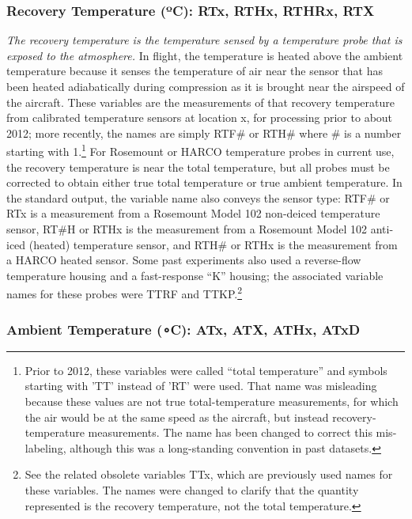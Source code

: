 \documentclass[
  english,
]{book}
\begin{document}
\hypertarget{recovery-t}{%
\subsubsection*{\texorpdfstring{Recovery Temperature ({º}C): RTx, RTHx,
RTHRx,
RTX}{Recovery Temperature (ºC): RTx, RTHx, RTHRx, RTX}}\label{recovery-t}}

\emph{The recovery temperature is the temperature sensed by a
temperature probe that is exposed to the atmosphere.} In flight, the
temperature is heated above the ambient temperature because it senses
the temperature of air near the sensor that has been heated
adiabatically during compression as it is brought near the airspeed of
the aircraft. These variables are the measurements of that recovery
temperature from calibrated temperature sensors at location x, for
processing prior to about 2012; more recently, the names are simply
RTF\# or RTH\# where \# is a number starting with 1.\footnote{Prior to
  2012, these variables were called ``total temperature'' and symbols
  starting with 'TT' instead of 'RT' were used. That name was misleading
  because these values are not true total-temperature measurements, for
  which the air would be at the same speed as the aircraft, but instead
  recovery-temperature measurements. The name has been changed to
  correct this mis-labeling, although this was a long-standing
  convention in past datasets.} For Rosemount or HARCO temperature
probes in current use, the recovery temperature is near the total
temperature, but all probes must be corrected to obtain either true
total temperature or true ambient temperature. In the standard output,
the variable name also conveys the sensor type: RTF\# or RTx is a
measurement from a Rosemount Model 102 non-deiced temperature sensor,
RT\#H or RTHx is the measurement from a Rosemount Model 102 anti-iced
(heated) temperature sensor, and RTH\# or RTHx is the measurement from a
HARCO heated sensor. Some past experiments also used a reverse-flow
temperature housing and a fast-response ``K'' housing; the associated
variable names for these probes were TTRF and TTKP.\footnote{See the
  related obsolete variables TTx, which are previously used names for
  these variables. The names were changed to clarify that the quantity
  represented is the recovery temperature, not the total temperature.}

\hypertarget{ambient-t}{%
\subsubsection*{\texorpdfstring{Ambient Temperature ({∘}C): ATx, ATX,
ATHx,
ATxD}{Ambient Temperature (∘C): ATx, ATX, ATHx, ATxD}}\label{ambient-t}}
\end{document}
